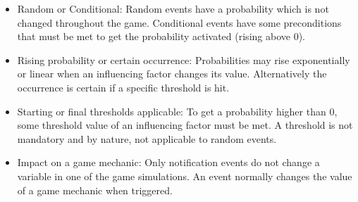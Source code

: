 \documentclass[11pt,titlepage,oneside,openany]{book}
\begin{document}
\begin{itemize}
\item Random or Conditional: Random events have a probability which is not changed throughout the game. Conditional events have some preconditions that must be met to get the probability activated (rising above 0).
\item Rising probability or certain occurrence: Probabilities may rise exponentially or linear when an influencing factor changes its value. Alternatively the occurrence is certain if a specific threshold is hit.
\item Starting or final thresholds applicable: To get a probability higher than 0, some threshold value of an influencing factor must be met. A threshold is not mandatory and by nature, not applicable to random events.
\item Impact on a game mechanic: Only notification events do not change a variable in one of the game simulations. An event normally changes the value of a game mechanic when triggered.
\end{itemize}
\end{document}
